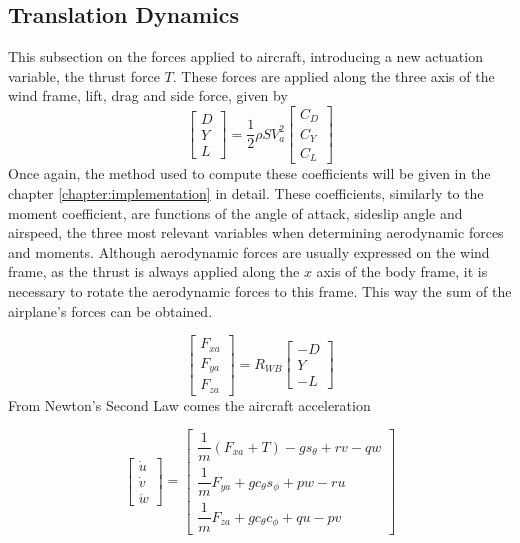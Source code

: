 \subsection{Translation Dynamics}
\label{section:background/model/guidance_dynamics}

This subsection on the forces applied to aircraft, introducing a new actuation variable, the thrust force $T$. These forces are applied along the three axis of the wind frame, lift, drag and side force, given by
\begin{equation}
\begin{bmatrix}
D\\
Y\\
L
\end{bmatrix}
= \dfrac{1}{2} \rho SV_a^2
\begin{bmatrix}
C_D\\
C_Y\\
C_L
\end{bmatrix}
\label{eq:forces}
\end{equation}
Once again, the method used to compute these coefficients will be given in the chapter \ref{chapter:implementation} in detail. These coefficients, similarly to the moment coefficient, are functions of the angle of attack, sideslip angle and airspeed, the three most relevant variables when determining aerodynamic forces and moments. Although aerodynamic forces are usually expressed on the wind frame, as the thrust is always applied along the $x$ axis of the body frame, it is necessary to rotate the aerodynamic forces to this frame. This way the sum of the airplane's forces can be obtained. 

\begin{equation}
\begin{bmatrix}
F_{xa}\\
F_{ya}\\
F_{za}
\end{bmatrix}
= R_{WB}
\begin{bmatrix}
-D\\
Y\\
-L
\end{bmatrix}
\label{eq:body_forces}
\end{equation}
From Newton's Second Law comes the aircraft acceleration

\begin{equation}
\begin{bmatrix}
\dot{u}\\
\dot{v}\\
\dot{w}
\end{bmatrix}
=
\begin{bmatrix}
\dfrac{1}{m}(F_{xa} + T) - gs_\theta +rv-qw\\
\dfrac{1}{m}F_{ya} + gc_\theta s_\phi + pw - ru\\
\dfrac{1}{m}F_{za} + gc_\theta c_\phi + qu - pv
\end{bmatrix}
\label{eq:boddy_acc}
\end{equation}

